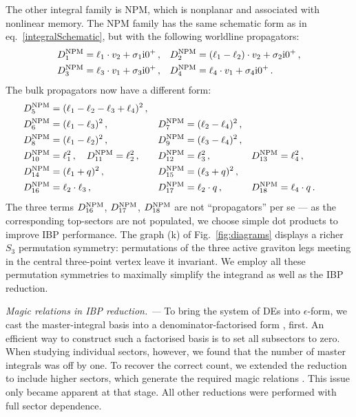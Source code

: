 \documentclass[twocolumn,superscriptaddress,amsmath, amssymb, amsfonts,preprintnumbers,aps,prd,longbibliography,nofootinbib]{revtex4-2}
\renewcommand{\sec}[1]{\textit{#1. --- }}
\def\eps{\epsilon}
\renewcommand{\i}{\ensuremath{\mathrm{i}}}
\def\eps{\epsilon}
\begin{document}
\begin{widetext}
{The other integral family is NPM,
which is nonplanar and associated with nonlinear memory.
The NPM} family has the same schematic form as in eq.~\eqref{integralSchematic},
but with the following worldline propagators:
{\begin{align}
\begin{aligned}
  D^{\rm NPM}_1&=\ell_1\cdot v_2+\sigma_1 \i 0^+\,, &
  D^{\rm NPM}_2&=(\ell_1-\ell_2)\cdot v_2+\sigma_2 \i 0^+\,,\\
  D^{\rm NPM}_3&=\ell_3\cdot v_1+\sigma_3 \i 0^+\,, &
  D^{\rm NPM}_4&=\ell_4\cdot v_1+\sigma_4 \i 0^+\,.
\end{aligned}
\end{align}}
The bulk propagators now have a different form:
{\begin{align}
\begin{aligned}
  D^{\rm NPM}_5&=(\ell_1-\ell_2-\ell_3+\ell_4)^2\,,	&& &&\\
  D^{\rm NPM}_6&=(\ell_1-\ell_3)^2\,, \qquad\qquad
  &&D^{\rm NPM}_7=(\ell_2-\ell_4)^2\,,				&& &&\\
  D^{\rm NPM}_8&=(\ell_1-\ell_2)^2\,, \qquad\qquad
  &&D^{\rm NPM}_9=(\ell_3-\ell_4)^2\,,				&&\\
  D^{\rm NPM}_{10}&=\ell_1^2\,, \quad
  D^{\rm NPM}_{11}=\ell_2^2\,, \quad
  &&D^{\rm NPM}_{12}=\ell_3^2\,, \quad
  &&D^{\rm NPM}_{13}=\ell_4^2\,,\\
  D^{\rm NPM}_{14}&=(\ell_1+q)^2\,, \qquad\qquad
  &&D^{\rm NPM}_{15}=(\ell_3+q)^2\,,				&&\\
  D^{\rm NPM}_{16}&=\ell_2\cdot\ell_3\,, \qquad\qquad
  &&D^{\rm NPM}_{17}=\ell_2\cdot q\,, \qquad
  &&D^{\rm NPM}_{18}=\ell_4\cdot q\,.
  \label{DNPs}
\end{aligned}
\end{align}}
The three terms {$D_{16}^{\rm NPM}$, $D_{17}^{\rm NPM}$, $D_{18}^{\rm NPM}$} are not ``propagators'' per se --- as the corresponding top-sectors are not populated, we choose simple dot products to improve IBP performance.
The graph (k) of Fig.~\ref{fig:diagrams} displays a richer $S_{3}$ permutation symmetry: permutations of the three active graviton legs meeting in the central three-point vertex leave it invariant.
We employ all these permutation symmetries to maximally simplify the integrand as well as the IBP reduction.


\sec{Magic relations in IBP reduction}
To bring the system of DEs into $\eps$-form, we cast the master-integral basis into a denominator-factorised form \cite{Usovitsch:2020jrk, Smirnov:2020quc}, first. An efficient way to construct such a factorised basis is to set all subsectors to zero. When studying individual sectors, however, we found that the number of master integrals was off by one. To recover the correct count, we extended the reduction to include higher sectors, which generate the required magic relations \cite{Maierhofer:2018gpa}. This issue only became apparent at that stage. All other reductions were performed with full sector dependence.


\end{widetext}
\end{document}
